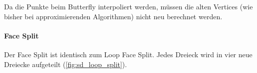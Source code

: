 Da die Punkte beim Butterfly interpoliert werden, müssen die alten Vertices
(wie bisher bei approximierenden Algorithmen) nicht neu berechnet werden. 

\paragraph*{Face Split}
Der Face Split ist identisch zum Loop Face Split.
Jedes Dreieck wird in vier neue Dreiecke aufgeteilt (\autoref{fig:sd_loop_split}).
\cite[S. 64ff]{Standford.24.07.2015} \cite[S. 72ff]{Zorin.subdivcourse}
\cite{Seeger01asub-atomic}
\cite{Gamasutra}
\cite{Sharp}
\cite{Zorin:1996:ISM:237170.237254}